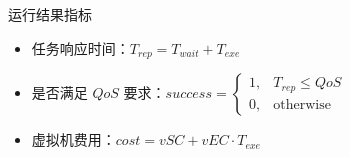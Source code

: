 \begin{frame}{运行结果指标}
    \begin{itemize}
        \item 任务响应时间：$T_{rep} = T_{wait} + T_{exe}$
        \item 是否满足 $QoS$ 要求：$success = \begin{cases}
                      1, & T_{rep} \leqslant QoS \\ 0,& \text{otherwise}
                  \end{cases}$
        \item 虚拟机费用：$cost = vSC + vEC \cdot T_{exe}$
    \end{itemize}
\end{frame}
